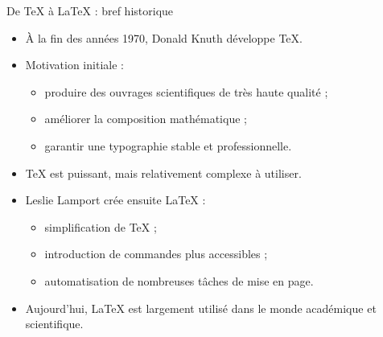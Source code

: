 \documentclass[aspectratio=169]{beamer}
\begin{document}
	\begin{frame}{De TeX à \LaTeX{} : bref historique}
		\begin{itemize}
			\item À la fin des années 1970, Donald Knuth développe TeX.
			
			\vspace{0.3cm}
			
			\item Motivation initiale :
			\begin{itemize}
				\item produire des ouvrages scientifiques de très haute qualité ;
				\item améliorer la composition mathématique ;
				\item garantir une typographie stable et professionnelle.
			\end{itemize}
			
			\vspace{0.3cm}
			
			\item TeX est puissant, mais relativement complexe à utiliser.
			
			\vspace{0.3cm}
			
			\item Leslie Lamport crée ensuite \LaTeX{} :
			\begin{itemize}
				\item simplification de TeX ;
				\item introduction de commandes plus accessibles ;
				\item automatisation de nombreuses tâches de mise en page.
			\end{itemize}
			
			\vspace{0.3cm}
			
			\item Aujourd’hui, \LaTeX{} est largement utilisé dans le monde académique et scientifique.
		\end{itemize}
	\end{frame}
	
	
\end{document}
